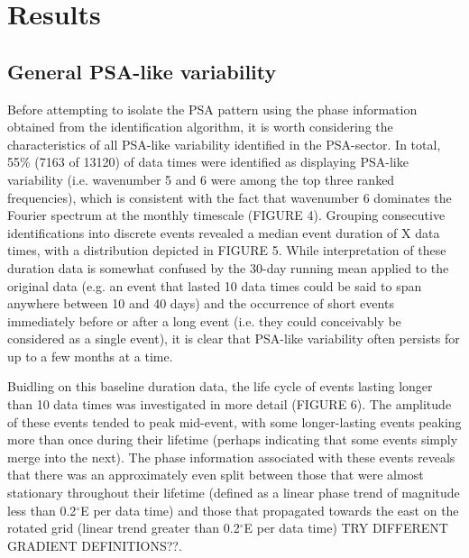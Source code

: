 \section{Results}

\subsection{General PSA-like variability}

Before attempting to isolate the PSA pattern using the phase information obtained from the identification algorithm, it is worth considering the characteristics of all PSA-like variability identified in the PSA-sector. In total, 55\% (7163 of 13120) of data times were identified as displaying PSA-like variability (i.e. wavenumber 5 and 6 were among the top three ranked frequencies), which is consistent with the fact that wavenumber 6 dominates the Fourier spectrum at the monthly timescale (FIGURE 4). Grouping consecutive identifications into discrete events revealed a median event duration of X data times, with a distribution depicted in FIGURE 5. While interpretation of these duration data is somewhat confused by the 30-day running mean applied to the original data (e.g. an event that lasted 10 data times could be said to span anywhere between 10 and 40 days) and the occurrence of short events immediately before or after a long event (i.e. they could conceivably be considered as a single event), it is clear that PSA-like variability often persists for up to a few months at a time.     

Buidling on this baseline duration data, the life cycle of events lasting longer than 10 data times was investigated in more detail (FIGURE 6). The amplitude of these events tended to peak mid-event, with some longer-lasting events peaking more than once during their lifetime (perhaps indicating that some events simply merge into the next). The phase information associated with these events reveals that there was an approximately even split between those that were almost stationary throughout their lifetime (defined as a linear phase trend of magnitude less than 0.2$^{\circ}$E per data time) and those that propagated towards the east on the rotated grid (linear trend greater than 0.2$^{\circ}$E per data time) TRY DIFFERENT GRADIENT DEFINITIONS??. 

